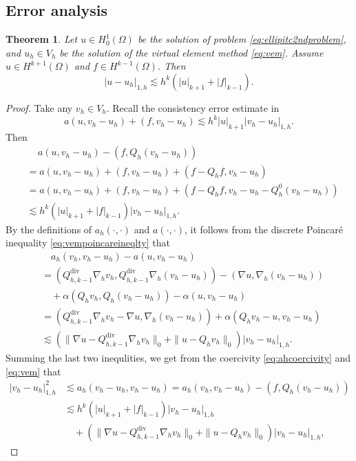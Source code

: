 \documentclass[10pt]{amsart}
\newtheorem{theorem}{Theorem}[section]
\renewcommand{\div}{\operatorname{div}}
\numberwithin{equation}{section}
\begin{document}
\subsection{Error analysis}
\begin{theorem}\label{thm:errorestimateH1}
Let $u\in H_0^1(\Omega)$ be the solution of problem \eqref{eq:ellipitc2ndproblem}, and $u_h\in V_h$ be the solution of the virtual element method \eqref{eq:vem}. Assume $u\in H^{k+1}(\Omega)$ and $f\in H^{k-1}(\Omega)$. Then
\begin{equation}\label{eq:errorestimateH1}
|u-u_h|_{1,h}\lesssim h^k(|u|_{k+1}+|f|_{k-1}).
\end{equation}
\end{theorem}
\begin{proof}
Take any $v_h\in V_h$. Recall the consistency error estimate in \cite[Lemma 5.5]{ChenHuang2020ncvem}
\[
a(u,v_h-u_h)+(f, v_h-u_h)\lesssim h^k|u|_{k+1}|v_h-u_h|_{1,h}.
\]
Then 
\begin{align*}
&\quad \,a(u,v_h-u_h)-(f, Q_h(v_h-u_h)) \\
&=a(u,v_h-u_h)+(f, v_h-u_h)+(f-Q_hf, v_h-u_h) \\
&=a(u,v_h-u_h)+(f, v_h-u_h)+(f-Q_hf, v_h-u_h-Q_h^0(v_h-u_h)) \\
&\lesssim h^k(|u|_{k+1}+|f|_{k-1})|v_h-u_h|_{1,h}.
\end{align*}
By the definitions of $a_h(\cdot, \cdot)$ and $a(\cdot, \cdot)$, it follows from the discrete Poincar\'e inequality \eqref{eq:vempoincareineqlty} that
\begin{align*}
&\quad a_h(v_h, v_h-u_h)-a(u,v_h-u_h)\\
&=(Q_{h,k-1}^{\div}\nabla_h v_h, Q_{h,k-1}^{\div}\nabla_h(v_h-u_h))-(\nabla u, \nabla_h(v_h-u_h))\\
&\quad +\alpha(Q_hv_h, Q_h(v_h-u_h))-\alpha(u, v_h-u_h) \\
&=(Q_{h,k-1}^{\div}\nabla_h v_h-\nabla u, \nabla_h(v_h-u_h))+\alpha(Q_hv_h-u,v_h-u_h)\\
&\lesssim (\|\nabla u-Q_{h,k-1}^{\div}\nabla_h v_h\|_0+\|u-Q_hv_h\|_0)|v_h-u_h|_{1,h}.
\end{align*}
Summing the last two inequlities, we get from the coercivity \eqref{eq:ahcoercivity} and \eqref{eq:vem} that
\begin{align*}
|v_h-u_h|_{1,h}^2&\lesssim a_h(v_h-u_h, v_h-u_h)=a_h(v_h, v_h-u_h)-(f, Q_h(v_h-u_h)) \\
&\lesssim h^k(|u|_{k+1}+|f|_{k-1})|v_h-u_h|_{1,h} \\
&\quad + (\|\nabla u-Q_{h,k-1}^{\div}\nabla_h v_h\|_0+\|u-Q_hv_h\|_0)|v_h-u_h|_{1,h},

\end{align*}
\end{proof}
\end{document}
